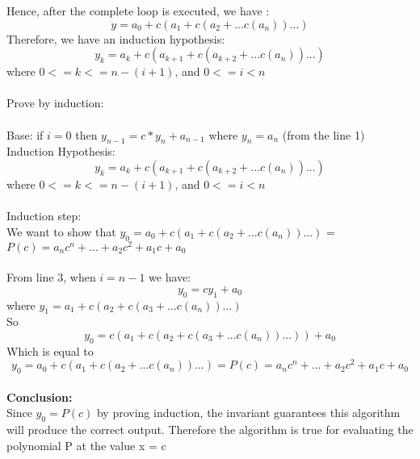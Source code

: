 \documentclass[11pt]{article}
\begin{document}
Hence, after the complete loop is executed, we have :
$$y = a_0 + c(a_1 + c(a_2 + ...c(a_n))...)$$
Therefore, we have an induction hypothesis: $$y_k = a_k + c(a_{k+1} + c(a_{k+2} + ...c(a_n))...)$$ where $0 <= k <= n-(i+1)$, and $0 <= i < n$\\\\   
\Large{Prove by induction:}\\\\
Base: if $i = 0$ then $y_{n - 1} = c*y_{n} + a_{n-1}$ where $y_n = a_n$ (from the line 1)\\
Induction Hypothesis: \Large{$$y_k = a_k + c(a_{k+1} + c(a_{k+2} + ...c(a_n))...)$$ where $0 <= k <= n-(i+1)$, and $0 <= i < n$\\\\  }
Induction step:\\
We want to show that $y_0 = a_0 + c(a_1 + c(a_2 + ...c(a_n))...)$ = $P(c) = a_nc^n + ... + a_2c^2 + a_1c + a_0$\\\\
From line 3, when $i = n-1$ we have: 
$$y_0 = cy_1 + a_0$$ where $y_1 = a_1 + c(a_2 + c(a_3 + ...c(a_n))...)$\\
So $$y_0 = c(a_1 + c(a_2 + c(a_3 + ...c(a_n))...)) + a_0$$
Which is equal to $$y_0 = a_0 + c(a_1 + c(a_2 + ...c(a_n))...) = P(c) = a_nc^n + ... + a_2c^2 + a_1c + a_0$$\\
\Large{\textbf{Conclusion:}}\\
Since $y_0 = P(c)$ by proving induction, the invariant guarantees this algorithm will produce the correct output. Therefore the algorithm is true for evaluating the polynomial P at the value x = c




\newpage
\end{document}
